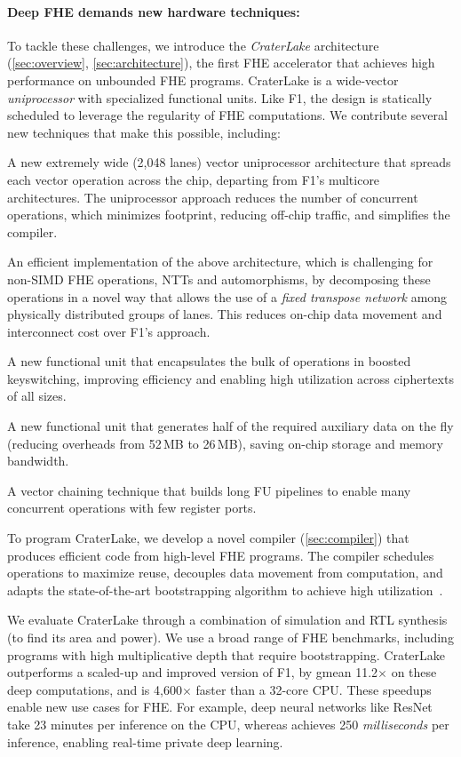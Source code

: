 \paragraph{Deep FHE demands new hardware techniques:}
To tackle these challenges, we introduce the \emph{CraterLake} architecture
(\autoref{sec:overview}, \autoref{sec:architecture}), the first FHE accelerator
that achieves high performance on unbounded FHE programs. CraterLake is a
wide-vector \emph{uniprocessor} with specialized functional units. Like F1, the
design is statically scheduled to leverage the regularity of FHE computations.
We contribute several new techniques that make this possible, including:
\begin{compactitem}
\item A new extremely wide (2,048 lanes) vector uniprocessor architecture that
    spreads each vector operation across the chip, departing from F1's
    multicore architectures. The uniprocessor approach reduces the number of
    concurrent operations, which minimizes footprint, reducing off-chip
    traffic, and simplifies the compiler.
\item An efficient implementation of the above architecture, which is
    challenging for non-SIMD FHE operations, NTTs and automorphisms, by
    decomposing these operations in a novel way that allows the use of a
    \emph{fixed transpose network} among physically distributed groups of
    lanes. This reduces on-chip data movement and interconnect cost over F1's
    approach.
\item A new functional unit that encapsulates the bulk of operations in boosted
    keyswitching, improving efficiency and enabling high utilization across
    ciphertexts of all sizes.
\item A new functional unit that generates half of the required auxiliary data
    on the fly (reducing overheads from 52\,MB to 26\,MB), saving on-chip
    storage and memory bandwidth.
\item A vector chaining technique that builds long FU pipelines to enable many
    concurrent operations with few register ports.
\end{compactitem}

To program CraterLake, we develop a novel compiler (\autoref{sec:compiler}) that
produces efficient code from high-level FHE programs. The compiler schedules
operations to maximize reuse, decouples data movement from computation, and
adapts the state-of-the-art bootstrapping algorithm to achieve high
utilization~\cite{bossuat:crypto21:efficient}.

We evaluate CraterLake through a combination of simulation and RTL synthesis
(to find its area and power). We use a broad range of FHE benchmarks, including
programs with high multiplicative depth that require bootstrapping. CraterLake
outperforms a scaled-up and improved version of F1, by gmean 11.2$\times$ on
these deep computations, and is 4,600$\times$ faster than a 32-core CPU. These
speedups enable new use cases for FHE. For example, deep neural networks like
ResNet take 23 minutes per inference on the CPU, whereas \name achieves 250
\emph{milliseconds} per inference, enabling real-time private deep learning.
